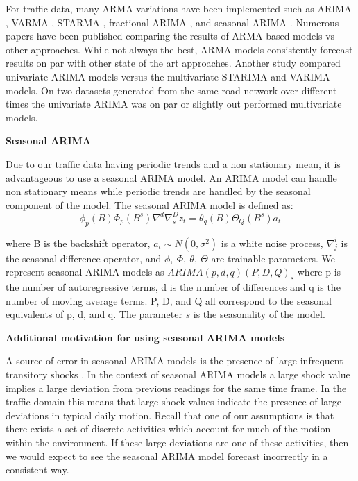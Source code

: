 For traffic data, many ARMA variations have been implemented such as ARIMA \cite{Williams2003}, VARMA \cite{Min2007}, STARMA \cite{Kamarianakis2003}, fractional ARIMA \cite{Xue1999}, and seasonal ARIMA \cite{Fillatre2003}.  Numerous papers \cite{VanDerVoort1996,Cho2003,Zhang2009,Taylor2006,Ishak2004} have been published comparing the results of ARMA based models vs other approaches.  While not always the best, ARMA models consistently forecast results on par with other state of the art approaches.  Another study \cite{Kamarianakis2003} compared univariate ARIMA models versus the multivariate STARIMA and VARIMA models.  On two datasets generated from the same road network over different times the univariate ARIMA was on par or slightly out performed multivariate models.  \newline

\textbf{Seasonal ARIMA}

Due to our traffic data having periodic trends and a non stationary mean, it is advantageous to use a seasonal ARIMA model.  An ARIMA model can handle non stationary means while periodic trends are handled by the seasonal component of the model.  The seasonal ARIMA model is defined as:
\begin{equation}
\label{eq:sarima}
\phi_{p}(B)\Phi_{p}(B^{s})\nabla^{d}\nabla^{D}_{s}z_{t} = \theta_{q}(B)\Theta_{Q}(B^{s})a_{t}
\end{equation}

\noindent
where B is the backshift operator, $a_{t} \sim N(0, \sigma^{2})$ is a white noise process, $\nabla^{i}_{j}$ is the seasonal difference operator, and $\phi,\  \Phi,\  \theta,\ \Theta$ are trainable parameters.  We represent seasonal ARIMA models as $ARIMA(p,d,q)(P,D,Q)_{s}$ where p is the number of autoregressive terms, d is the number of differences and q is the number of moving average terms.  P, D, and Q all correspond to the seasonal equivalents of p, d, and q.  The parameter $s$ is the seasonality of the model.\newline

\textbf{Additional motivation for using seasonal ARIMA models}

A source of error in seasonal ARIMA models is the presence of large infrequent transitory shocks \cite{Balke1994}.  In the context of seasonal ARIMA models a large shock value implies a large deviation from previous readings for the same time frame.  In the traffic domain this means that large shock values indicate the presence of large deviations in typical daily motion.  Recall that one of our assumptions is that there exists a set of discrete activities which account for much of the motion within the environment.  If these large deviations are one of these activities, then we would expect to see the seasonal ARIMA model forecast incorrectly in a consistent way.  

